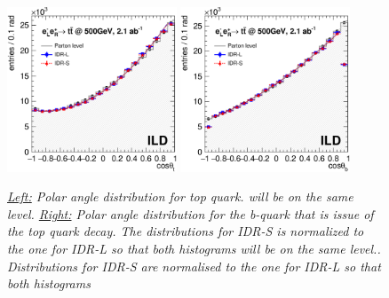 \documentclass[preprint]{elsarticle}
\newcommand{\qgsp}{{\sc qgsp\_bert}}
\newcommand{\ftfp}{{\sc ftfp\_bert}}
\newcommand{\qbbc}{{\sc qbbc}}
\begin{document}
\begin{figure}
\centering
\includegraphics[width=0.45\textwidth]{figures_TTbar/results2models_t.eps}
\includegraphics[width=0.45\textwidth]{figures_TTbar/results2models_b.eps}
\caption{\label{fig:res-ttbar} \sl \underline{Left:} Polar angle distribution for top quark.  will be on the same level. \underline{Right:}  Polar angle distribution for the b-quark that is issue of the top quark decay. The distributions for IDR-S is normalized to the one for IDR-L so that both histograms will be on the same level.. Distributions for IDR-S are normalised to the one for IDR-L so that both histograms}
\end{figure}





\end{document}
